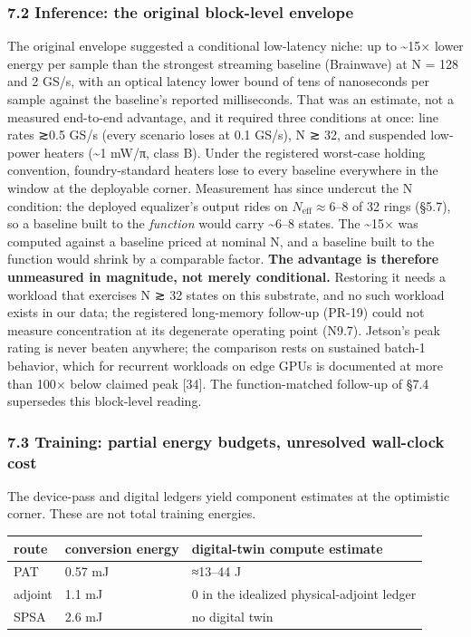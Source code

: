 \documentclass[
  10pt,
]{article}
\newcounter{none} %
\begin{document}
\subsubsection{7.2 Inference: the original block-level
envelope}\label{inference-the-original-block-level-envelope}

The original envelope suggested a conditional low-latency niche: up to
\textasciitilde15× lower energy per sample than the strongest streaming
baseline (Brainwave) at N = 128 and 2 GS/s, with an optical latency
lower bound of tens of nanoseconds per sample against the baseline's
reported milliseconds. That was an estimate, not a measured end-to-end
advantage, and it required three conditions at once: line rates ≳0.5
GS/s (every scenario loses at 0.1 GS/s), N ≳ 32, and suspended low-power
heaters (\textasciitilde1 mW/π, class B). Under the registered
worst-case holding convention, foundry-standard heaters lose to every
baseline everywhere in the window at the deployable corner. Measurement
has since undercut the N condition: the deployed equalizer's output
rides on \(N_\text{eff} \approx 6\)--\(8\) of 32 rings (§5.7), so a
baseline built to the \emph{function} would carry \textasciitilde6--8
states. The \textasciitilde15× was computed against a baseline priced at
nominal N, and a baseline built to the function would shrink by a
comparable factor. \textbf{The advantage is therefore unmeasured in
magnitude, not merely conditional.} Restoring it needs a workload that
exercises N ≳ 32 states on this substrate, and no such workload exists
in our data; the registered long-memory follow-up (PR-19) could not
measure concentration at its degenerate operating point (N9.7). Jetson's
peak rating is never beaten anywhere; the comparison rests on sustained
batch-1 behavior, which for recurrent workloads on edge GPUs is
documented at more than 100× below claimed peak {[}34{]}. The
function-matched follow-up of §7.4 supersedes this block-level reading.

\subsubsection{7.3 Training: partial energy budgets, unresolved
wall-clock
cost}\label{training-partial-energy-budgets-unresolved-wall-clock-cost}

The device-pass and digital ledgers yield component estimates at the
optimistic corner. These are not total training energies.

{\def\LTcaptype{none} %
\begin{longtable}[]{@{}lll@{}}
\toprule\noalign{}
route & conversion energy & digital-twin compute estimate \\
\midrule\noalign{}
\endhead
\bottomrule\noalign{}
\endlastfoot
PAT & 0.57 mJ & ≈13--44 J \\
adjoint & 1.1 mJ & 0 in the idealized physical-adjoint ledger \\
SPSA & 2.6 mJ & no digital twin \\
\end{longtable}
}
\end{document}
